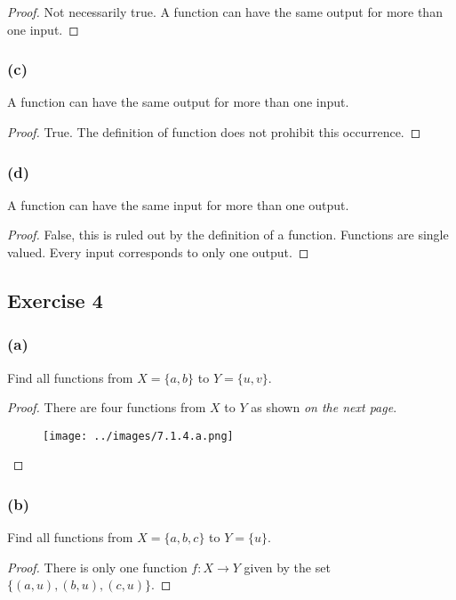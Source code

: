 \documentclass[14pt]{extarticle}
\begin{document}
\begin{proof}
    Not necessarily true. A function can have the same output for more than one input.
\end{proof}

\subsubsection{(c)}
A function can have the same output for more than one input.

\begin{proof}
    True. The definition of function does not prohibit this occurrence.
\end{proof}

\subsubsection{(d)}
A function can have the same input for more than one output.

\begin{proof}
    False, this is ruled out by the definition of a function. Functions are single valued. Every input corresponds to
    only one output.
\end{proof}

\subsection{Exercise 4}
\subsubsection{(a)}
Find all functions from \(X = \{a, b\}\) to \(Y = \{u, v\}\).

\begin{proof}
    There are four functions from $X$ to $Y$ as shown {\it on the next page}.

    \begin{figure}[ht!]
        \centering
        \texttt{[image: ../images/7.1.4.a.png]}
    \end{figure}

\end{proof}

\subsubsection{(b)}
Find all functions from \(X = \{a, b, c\}\) to \(Y = \{u\}\).

\begin{proof}
    There is only one function $f: X \to Y$ given by the set \(\{(a,u), (b,u), (c,u)\}\).
\end{proof}
\end{document}

